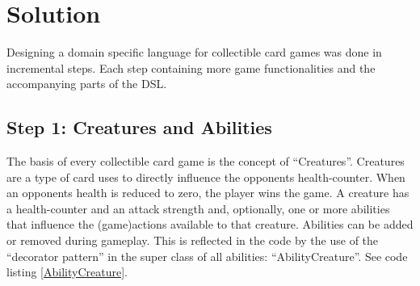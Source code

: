 \documentclass[twocolumn]{phdsymp}
\begin{document}
\section{Solution}
\label{Solution}
Designing a domain specific language for collectible card games was done in incremental steps. Each step containing more game functionalities and the accompanying parts of the DSL.
\subsection*{Step 1: Creatures and Abilities}
The basis of every collectible card game is the concept of ``Creatures''. Creatures are a type of card uses to directly influence the opponents health-counter. When an opponents health is reduced to zero, the player wins the game. A creature has a health-counter and an attack strength and, optionally, one or more abilities that influence the (game)actions available to that creature. Abilities can be added or removed during gameplay. This is reflected in the code by the use of the ``decorator pattern'' in the super class of all abilities: ``AbilityCreature''. See code listing \ref{AbilityCreature}.
\begin{figure*}[H]
\label{AbilityCreature}

\end{figure*}
\end{document}
